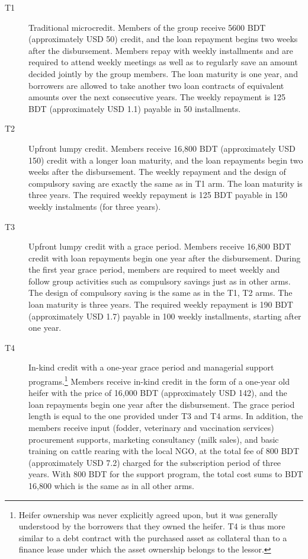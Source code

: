 	\begin{description}
	\vspace{1.0ex}\setlength{\itemsep}{1.0ex}\setlength{\baselineskip}{12pt}
	\item[T1]	Traditional microcredit. Members of the group receive 5600 BDT (approximately USD 50) credit, and the loan repayment begins two weeks after the disbursement. Members repay with weekly installments and are required to attend weekly meetings as well as to regularly save an amount decided jointly by the group members. The loan maturity is one year, and borrowers are allowed to take another two loan contracts of equivalent amounts over the next consecutive years. The weekly repayment is 125 BDT (approximately USD 1.1) payable in 50 installments.
	\item[T2]	Upfront lumpy credit. Members receive 16,800 BDT (approximately USD 150) credit with a longer loan maturity, and the loan repayments begin two weeks after the disbursement. The weekly repayment and the design of compulsory saving are exactly the same as in \textsf{T1} arm. The loan maturity is three years. The required weekly repayment is 125 BDT payable in 150 weekly instalments (for three years). 
	\item[T3]	Upfront lumpy credit with a grace period. Members receive 16,800 BDT credit with loan repayments begin one year after the disbursement. During the first year grace period, members are required to meet weekly and follow group activities such as compulsory savings just as in other arms. The design of compulsory saving is the same as in the \textsf{T1}, \textsf{T2} arms. The loan maturity is three years. The required weekly repayment is 190 BDT (approximately USD 1.7) payable in 100 weekly installments, starting after one year.
	\item[T4]	In-kind credit with a one-year grace period and managerial support programs.\footnote{Heifer ownership was never explicitly agreed upon, but it was generally understood by the borrowers that they owned the heifer. T4 is thus more similar to a debt contract with the purchased asset as collateral than to a finance lease under which the asset ownership belongs to the lessor. } Members receive in-kind credit in the form of a one-year old heifer with the price of 16,000 BDT (approximately USD 142), and the loan repayments begin one year after the disbursement. The grace period length is equal to the one provided under \textsf{T3} and \textsf{T4} arms. In addition, the members receive input (fodder, veterinary and vaccination services) procurement supports, marketing consultancy (milk sales), and basic training on cattle rearing with the local NGO, at the total fee of 800 BDT (approximately USD 7.2) charged for the subscription period of three years. With 800 BDT for the support program, the total cost sums to BDT 16,800 which is the same as in all other arms.
	\end{description}

